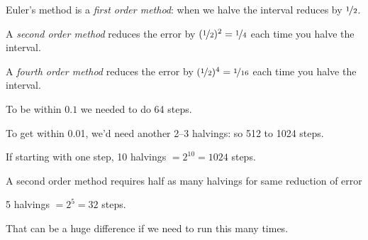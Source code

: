 \documentclass[10pt,aspectratio=169]{beamer}
\begin{document}
\begin{frame}

Euler's method is a \emph{first order method}:
when we halve the interval reduces by $\nicefrac{1}{2}$.

\medskip
\pause

A \emph{second order method} reduces the error by
$(\nicefrac{1}{2})^2 = \nicefrac{1}{4}$ each time you halve the interval.

\medskip
\pause

A \emph{fourth order method} reduces the error by
$(\nicefrac{1}{2})^4 = \nicefrac{1}{16}$ each time you halve the interval.

\medskip
\pause

To be within $0.1$ we needed to do 64 steps.

\medskip
\pause

To get within 0.01, we'd need another 2--3 halvings: so 512 to 1024 steps.

\medskip
\pause

If starting with one step, 10 halvings ${} = 2^{10} = 1024$ steps.

\medskip
\pause

A second order method requires half as many halvings for same
reduction of error

\medskip
\pause

5 halvings ${} = 2^{5} = 32$ steps.

\medskip
\pause

That can be a huge difference if we need to run this many times.
\end{frame}
\end{document}
